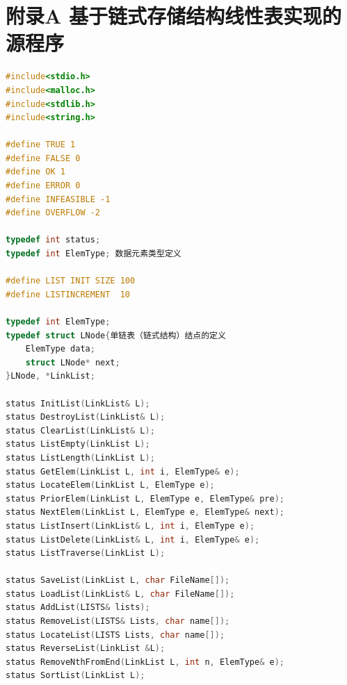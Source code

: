 \documentclass[supercite]{Experimental_Report}
\theoremstyle{definition}
\begin{document}
		\section{附录A 基于链式存储结构线性表实现的源程序}
		\begin{lstlisting}[language=C] 
			#include<stdio.h>
#include<malloc.h>
#include<stdlib.h>
#include<string.h>

#define TRUE 1
#define FALSE 0
#define OK 1
#define ERROR 0
#define INFEASIBLE -1
#define OVERFLOW -2

typedef int status;
typedef int ElemType; 数据元素类型定义

#define LIST INIT SIZE 100
#define LISTINCREMENT  10

typedef int ElemType;
typedef struct LNode{单链表（链式结构）结点的定义
	ElemType data;
	struct LNode* next;
}LNode, *LinkList;

status InitList(LinkList& L);
status DestroyList(LinkList& L);
status ClearList(LinkList& L);
status ListEmpty(LinkList L);
status ListLength(LinkList L);
status GetElem(LinkList L, int i, ElemType& e);
status LocateElem(LinkList L, ElemType e);
status PriorElem(LinkList L, ElemType e, ElemType& pre);
status NextElem(LinkList L, ElemType e, ElemType& next);
status ListInsert(LinkList& L, int i, ElemType e);
status ListDelete(LinkList& L, int i, ElemType& e);
status ListTraverse(LinkList L);

status SaveList(LinkList L, char FileName[]);
status LoadList(LinkList& L, char FileName[]);
status AddList(LISTS& lists);
status RemoveList(LISTS& Lists, char name[]);
status LocateList(LISTS Lists, char name[]);
status ReverseList(LinkList &L);
status RemoveNthFromEnd(LinkList L, int n, ElemType& e);
status SortList(LinkList L);


\end{lstlisting}
\end{document}
